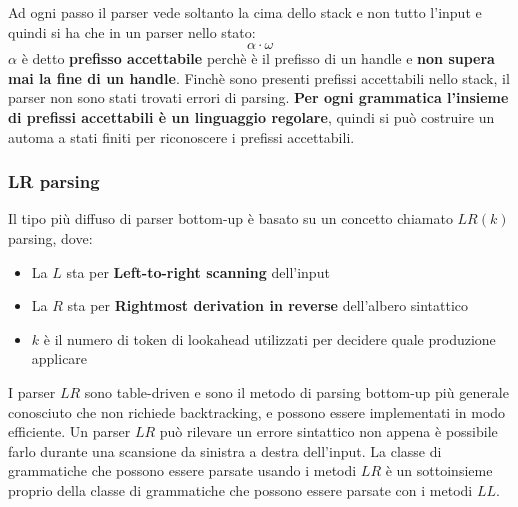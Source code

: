 \documentclass[a4paper]{article}
\begin{document}
\vspace{1em}
\noindent
Ad ogni passo il parser vede soltanto la cima dello stack e non tutto l'input e quindi
si ha che in un parser nello stato:
\[
  \alpha \cdot \omega
\] 
\( \alpha \) è detto \textbf{prefisso accettabile} perchè è il prefisso di un handle
e \textbf{non supera mai la fine di un handle}. Finchè sono presenti prefissi accettabili
nello stack, il parser non sono stati trovati errori di parsing.
\textbf{Per ogni grammatica l'insieme di prefissi accettabili è un linguaggio regolare},
quindi si può costruire un automa a stati finiti per riconoscere i prefissi accettabili.

\subsubsection{LR parsing}
Il tipo più diffuso di parser bottom-up è basato su un concetto chiamato \( LR(k) \)
parsing, dove:
\begin{itemize}
  \item La \( L \) sta per \textbf{Left-to-right scanning} dell'input
  \item La \( R \) sta per \textbf{Rightmost derivation in reverse} dell'albero
    sintattico
  \item \( k \) è il numero di token di lookahead utilizzati per decidere quale
    produzione applicare
\end{itemize}
I parser \( LR \) sono table-driven e sono il metodo di parsing bottom-up più generale
conosciuto che non richiede backtracking, e possono essere implementati in modo efficiente.
Un parser \( LR \) può rilevare un errore sintattico non appena è possibile farlo
durante una scansione da sinistra a destra dell'input. La classe di grammatiche che
possono essere parsate usando i metodi \( LR \) è un sottoinsieme proprio della classe
di grammatiche che possono essere parsate con i metodi \( LL \).
\end{document}
